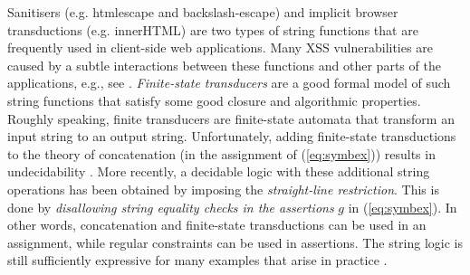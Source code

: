Sanitisers (e.g. htmlescape and backslash-escape)
and implicit browser transductions (e.g. innerHTML)
are two types of string functions that are frequently used in client-side
web applications. Many XSS vulnerabilities are caused by
a subtle interactions between these functions and other parts of the
applications, e.g., see \cite{web-model,Kern14,DV13,LB16,mXSS}. 
\emph{Finite-state transducers} 
\cite{BEK,web-model,DV13,symbolic-transducer,LB16}
are a good formal model of such string functions that satisfy some
good closure and algorithmic properties. 
Roughly speaking, finite transducers are
finite-state automata that transform an input string to an output string. 
Unfortunately, adding finite-state transductions to
the theory of concatenation (in the assignment of (\ref{eq:symbex})) results in 
undecidability \cite{LB16}.
More recently, a decidable logic with these additional string 
operations \cite{LB16} has been obtained by imposing 
the \emph{straight-line restriction}. %
This is done 
by \emph{disallowing string equality checks in the assertions} $g$ in 
(\ref{eq:symbex}). In other words, concatenation and finite-state transductions
can be used in an assignment, while regular constraints can be used in
assertions. The string logic is still 
sufficiently expressive
for many examples that arise in practice \cite{LB16,HJLRV18}.





